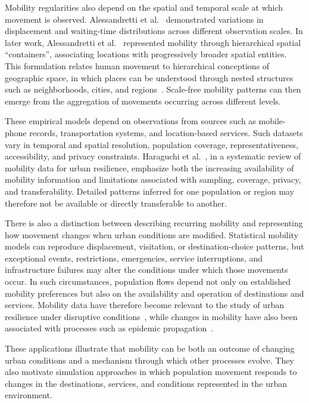 Mobility regularities also depend on the spatial and temporal scale at which movement is observed. Alessandretti et al.~\cite{natureAlessandretti2017multiScaleSpatioTemporal} demonstrated variations in displacement and waiting-time distributions across different observation scales. In later work, Alessandretti et al.~\cite{alessandretti2020nature} represented mobility through hierarchical spatial ``containers'', associating locations with progressively broader spatial entities. This formulation relates human movement to hierarchical conceptions of geographic space, in which places can be understood through nested structures such as neighborhoods, cities, and regions~\cite{naturePaasi2004placeAndRegion,natureBatty2006hierarchy,naturePumain2006hierarchy}. Scale-free mobility patterns can then emerge from the aggregation of movements occurring across different levels.

These empirical models depend on observations from sources such as mobile-phone records, transportation systems, and location-based services. Such datasets vary in temporal and spatial resolution, population coverage, representativeness, accessibility, and privacy constraints. Haraguchi et al.~\cite{haraguchi2022mobilityDataReview}, in a systematic review of mobility data for urban resilience, emphasize both the increasing availability of mobility information and limitations associated with sampling, coverage, privacy, and transferability. Detailed patterns inferred for one population or region may therefore not be available or directly transferable to another.

There is also a distinction between describing recurring mobility and representing how movement changes when urban conditions are modified. Statistical mobility models can reproduce displacement, visitation, or destination-choice patterns, but exceptional events, restrictions, emergencies, service interruptions, and infrastructure failures may alter the conditions under which those movements occur. In such circumstances, population flows depend not only on established mobility preferences but also on the availability and operation of destinations and services. Mobility data have therefore become relevant to the study of urban resilience under disruptive conditions~\cite{haraguchi2022mobilityDataReview}, while changes in mobility have also been associated with processes such as epidemic propagation~\cite{natureKramer2020mobilityCovid,hernandez2021human}. 

These applications illustrate that mobility can be both an outcome of changing urban conditions and a mechanism through which other processes evolve. They also motivate simulation approaches in which population movement responds to changes in the destinations, services, and conditions represented in the urban environment.

